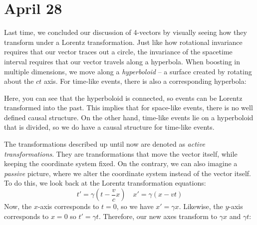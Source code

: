\section{April 28}
Last time, we concluded our discussion of 4-vectors by visually seeing how they transform under a Lorentz
transformation. Just like how rotational invariance requires that our vector traces out a circle, the
invariance of the spacetime interval requires that our vector travels along a hyperbola. When boosting in
multiple dimensions, we move along a \textit{hyperboloid} -- a surface created by rotating about the \( ct \)
axis. For time-like events, there is also a corresponding hyperbola:
\begin{center}
\end{center}
Here, you can see that the hyperboloid is connected, so events can be Lorentz transformed into the past.  
This implies that for space-like events, there is no well defined causal structure. On the other hand, 
time-like events lie on a hyperboloid that is divided, so we do have a causal structure for time-like events. 

The transformations described up until now are denoted as \textit{active transformations}. They are
transformations that move the vector itself, while keeping the coordinate system fixed. On the contrary, we
can also imagine a \textit{passive} picture, where we alter the coordinate system instead of the vector
itself. To do this, we look back at the Lorentz transformation equations:
\[
	t' = \gamma\left( t - \frac{v}{c}x \right) \quad x' = \gamma(x - vt)
\]
Now, the \( x \)-axis corresponds to \( t = 0 \), so we have \( x' = \gamma x \). Likewise, the \( y \)-axis
corresponds to \( x = 0 \) so \( t' = \gamma t \). Therefore, our new axes transform to \( \gamma x \) and \(
\gamma t\):


